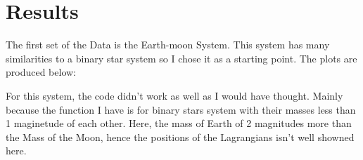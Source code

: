 \documentclass{article}
\begin{document}
\section{Results}
The first set of the Data is the Earth-moon System. This system has many similarities to a binary star system so I chose it as a starting point. The plots are produced below:
\begin{figure}[H]
\end{figure}

\begin{figure}[H]
\end{figure}
For this system, the code didn't work as well as I would have thought. Mainly because the function I have is for binary stars system with their masses less than 1 maginetude of each other. Here, the mass of Earth of 2 magnitudes more than the Mass of the Moon, hence the positions of the Lagrangians isn't well showned here.
\end{document}
